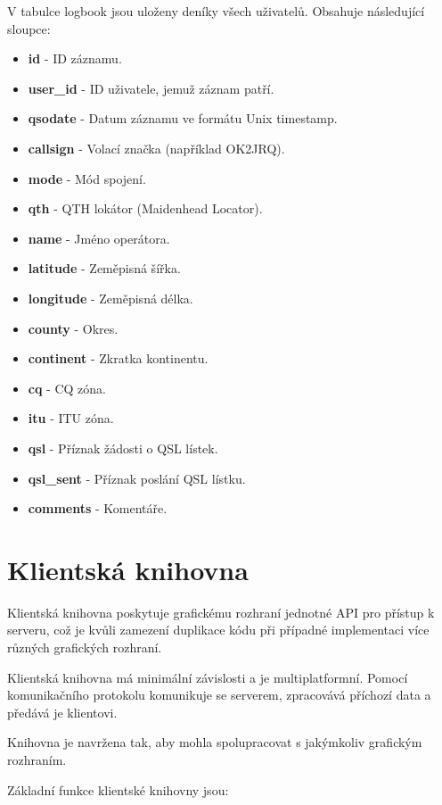 V tabulce logbook jsou uloženy deníky všech uživatelů. Obsahuje následující sloupce:

\begin{itemize}
\item \textbf{id} - ID záznamu.
\item \textbf{user\_id} - ID uživatele, jemuž záznam patří.
\item \textbf{qsodate} - Datum záznamu ve formátu Unix timestamp.
\item \textbf{callsign} - Volací značka (například OK2JRQ).
\item \textbf{mode} - Mód spojení. %
\item \textbf{qth} - QTH lokátor (Maidenhead Locator).
\item \textbf{name} - Jméno operátora.
\item \textbf{latitude} - Zeměpisná šířka.
\item \textbf{longitude} - Zeměpisná délka.
\item \textbf{county} - Okres.
\item \textbf{continent} - Zkratka kontinentu.
\item \textbf{cq} - CQ zóna.
\item \textbf{itu} - ITU zóna.
\item \textbf{qsl} - Příznak žádosti o QSL lístek. %
\item \textbf{qsl\_sent} - Příznak poslání QSL lístku.
\item \textbf{comments} - Komentáře.
\end{itemize}

\section{Klientská knihovna}
\label{navrh_knihovna}

Klientská knihovna poskytuje grafickému rozhraní jednotné API pro přístup k
serveru, což je kvůli zamezení duplikace kódu při případné implementaci více
různých grafických rozhraní.

Klientská knihovna má minimální závislosti a je multiplatformní. Pomocí komunikačního protokolu
komunikuje se serverem, zpracovává příchozí data a předává je klientovi.

Knihovna je navržena tak, aby mohla spolupracovat s jakýmkoliv grafickým
rozhraním. %

Základní funkce klientské knihovny jsou:

